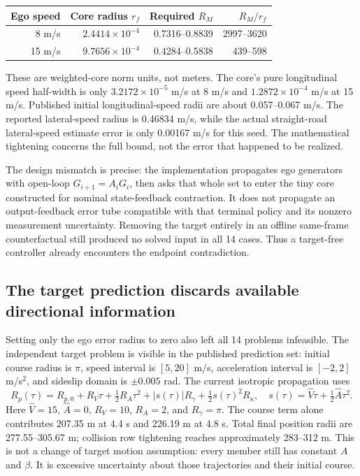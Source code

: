 \documentclass[11pt]{article}
\begin{document}
\begin{center}
\begin{tabular}{rrrr}
\toprule
Ego speed & Core radius $r_f$ & Required $R_M$ & $R_M/r_f$\\
\midrule
8 m/s & $2.4414\times10^{-4}$ & 0.7316--0.8839 & 2997--3620\\
15 m/s & $9.7656\times10^{-4}$ & 0.4284--0.5838 & 439--598\\
\bottomrule
\end{tabular}
\end{center}
These are weighted-core norm units, not meters. The core's pure longitudinal
speed half-width is only $3.2172\times10^{-5}$ m/s at 8 m/s and
$1.2872\times10^{-4}$ m/s at 15 m/s. Published initial longitudinal-speed
radii are about 0.057--0.067 m/s. The reported lateral-speed radius is
0.46834 m/s, while the actual straight-road lateral-speed estimate error is
only 0.00167 m/s for this seed. The mathematical tightening concerns the full
bound, not the error that happened to be realized.

The design mismatch is precise: the implementation propagates ego generators
with open-loop $G_{i+1}=A_iG_i$, then asks that whole set to enter the tiny core
constructed for nominal state-feedback contraction. It does not propagate an
output-feedback error tube compatible with that terminal policy and its
nonzero measurement uncertainty. Removing the target entirely in an offline
same-frame counterfactual still produced no solved input in all 14 cases.
Thus a target-free controller already encounters the endpoint contradiction.

\subsection{The target prediction discards available directional information}
Setting only the ego error radius to zero also left all 14 problems infeasible.
The independent target problem is visible in the published prediction set:
initial course radius is $\pi$, speed interval is $[5,20]$ m/s, acceleration
interval is $[-2,2]$ m/s$^2$, and sideslip domain is $\pm0.005$ rad.
The current isotropic propagation uses
\[
 R_p(\tau)=R_{p,0}+R_V\tau+\tfrac12 R_A\tau^2
     +|s(\tau)|R_\gamma+\tfrac12 s(\tau)^2R_\kappa,
 \quad s(\tau)=\widehat V\tau+\tfrac12\widehat A\tau^2.
\]
Here $\widehat V=15$, $\widehat A=0$, $R_V=10$, $R_A=2$, and
$R_\gamma=\pi$. The course term alone contributes 207.35 m at 4.4 s and
226.19 m at 4.8 s. Total final position radii are 277.55--305.67 m; collision
row tightening reaches approximately 283--312 m. This is not a change of
target motion assumption: every member still has constant $A$ and $\beta$.
It is excessive uncertainty about those trajectories and their initial course.
\end{document}
